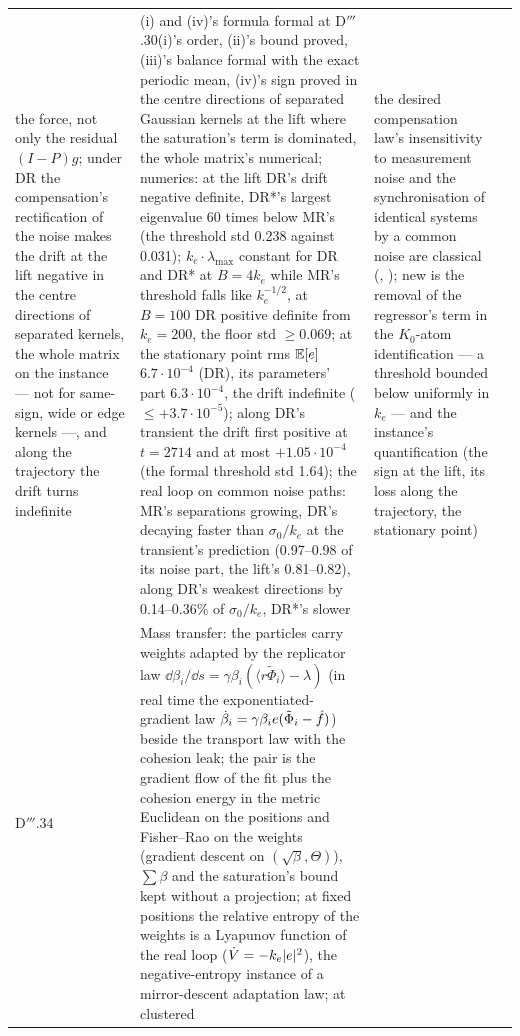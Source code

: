 {\begin{longtable}{@{}>{\raggedright\arraybackslash}p{}>{\raggedright\arraybackslash}p{}%
>{\raggedright\arraybackslash}p{}>{\raggedright\arraybackslash}p{}@{}}
the force, not only the residual $(I - P)g$; under DR the compensation's rectification of the noise makes the drift at
the lift negative in the centre directions of separated kernels, the whole matrix on the instance --- not for
same-sign, wide or edge kernels ---, and along the trajectory the drift turns indefinite
& (i) and (iv)'s formula formal at D$'''$.30(i)'s order, (ii)'s bound proved, (iii)'s balance formal with the exact
periodic mean, (iv)'s sign proved in the centre directions of separated Gaussian kernels at the lift where the
saturation's term is dominated, the whole matrix's numerical; numerics: at the lift DR's drift negative definite,
DR*'s largest eigenvalue 60 times below MR's (the threshold std 0.238 against 0.031); $k_e\cdot\lambda_{\max}$
constant for DR and DR* at $B = 4k_e$ while MR's threshold falls like $k_e^{-1/2}$, at $B = 100$ DR positive definite
from $k_e = 200$, the floor std $\ge0.069$; at the stationary point rms $\mathbb{E}[e]$ $6.7\cdot10^{-4}$ (DR), its
parameters' part $6.3\cdot10^{-4}$, the drift indefinite ($\le+3.7\cdot10^{-5}$); along DR's transient the drift first
positive at $t = 2714$ and at most $+1.05\cdot10^{-4}$ (the formal threshold std 1.64); the real loop on common noise
paths: MR's separations growing, DR's decaying faster than $\sigma_0/k_e$ at the transient's prediction (0.97--0.98 of
its noise part, the lift's 0.81--0.82), along DR's weakest directions by 0.14--0.36\% of $\sigma_0/k_e$, DR*'s slower
& the desired compensation law's insensitivity to measurement noise and the synchronisation of identical systems by a
common noise are classical (\cite{S53}, \cite{S61}); new is the removal of the regressor's term in the $K_0$-atom
identification --- a threshold bounded below uniformly in $k_e$ --- and the instance's quantification (the sign at the
lift, its loss along the trajectory, the stationary point)\\
\addlinespace[0.5pt]
D$'''$.34 & Mass transfer: the particles carry weights adapted by the replicator law
$\dd\beta_i/\dd s = \gamma\beta_i(\langle r\tilde\Phi_i\rangle - \lambda)$ (in real time the exponentiated-gradient
law $\dot\beta_i = \gamma\beta_ie(\tilde\Phi_i - \hat f)$) beside the transport law with the cohesion leak; the pair is
the gradient flow of the fit plus the cohesion energy in the metric Euclidean on the positions and Fisher--Rao on the
weights (gradient descent on $(\sqrt\beta,\Theta)$), $\sum\beta$ and the saturation's bound kept without a
projection; at fixed positions the relative entropy of the weights is a Lyapunov function of the real loop
($\dot V = -k_e\lvert e\rvert^2$), the negative-entropy instance of a mirror-descent adaptation law; at clustered

\end{longtable}}
